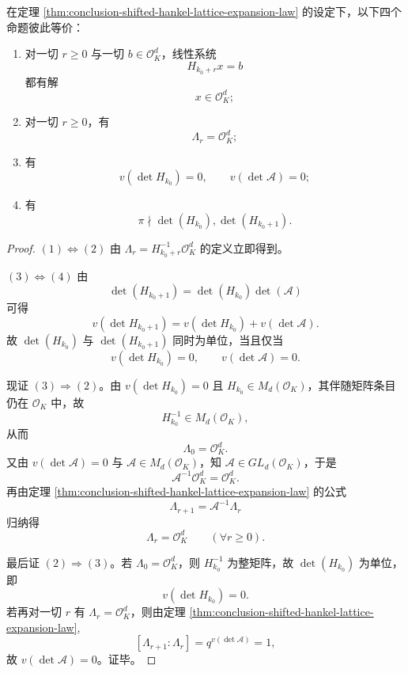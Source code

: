 \begin{theorem}[统一积分性的四重等价]\label{thm:conclusion-shifted-hankel-uniform-integrality-fourfold-equivalence}
在定理 \ref{thm:conclusion-shifted-hankel-lattice-expansion-law} 的设定下，以下四个命题彼此等价：
\begin{enumerate}
  \item 对一切 \(r\ge 0\) 与一切 \(b\in \mathcal O_K^d\)，线性系统
  \[
  H_{k_0+r}x=b
  \]
  都有解
  \[
  x\in \mathcal O_K^d;
  \]
  \item 对一切 \(r\ge 0\)，有
  \[
  \Lambda_r=\mathcal O_K^d;
  \]
  \item 有
  \[
  v(\det H_{k_0})=0,\qquad v(\det \mathcal A)=0;
  \]
  \item 有
  \[
  \pi\nmid \det(H_{k_0}),\det(H_{k_0+1}).
  \]
\end{enumerate}
\end{theorem}
\begin{proof}
\((1)\Leftrightarrow(2)\) 由 \(\Lambda_r=H_{k_0+r}^{-1}\mathcal O_K^d\) 的定义立即得到。

\((3)\Leftrightarrow(4)\) 由
\[
\det(H_{k_0+1})=\det(H_{k_0})\det(\mathcal A)
\]
可得
\[
v(\det H_{k_0+1})=v(\det H_{k_0})+v(\det \mathcal A).
\]
故 \(\det(H_{k_0})\) 与 \(\det(H_{k_0+1})\) 同时为单位，当且仅当
\[
v(\det H_{k_0})=0,\qquad v(\det \mathcal A)=0.
\]

现证 \((3)\Rightarrow(2)\)。由 \(v(\det H_{k_0})=0\) 且 \(H_{k_0}\in M_d(\mathcal O_K)\)，其伴随矩阵条目仍在 \(\mathcal O_K\) 中，故
\[
H_{k_0}^{-1}\in M_d(\mathcal O_K),
\]
从而
\[
\Lambda_0=\mathcal O_K^d.
\]
又由 \(v(\det \mathcal A)=0\) 与 \(\mathcal A\in M_d(\mathcal O_K)\)，知 \(\mathcal A\in GL_d(\mathcal O_K)\)，于是
\[
\mathcal A^{-1}\mathcal O_K^d=\mathcal O_K^d.
\]
再由定理 \ref{thm:conclusion-shifted-hankel-lattice-expansion-law} 的公式
\[
\Lambda_{r+1}=\mathcal A^{-1}\Lambda_r
\]
归纳得
\[
\Lambda_r=\mathcal O_K^d\qquad(\forall r\ge 0).
\]

最后证 \((2)\Rightarrow(3)\)。若 \(\Lambda_0=\mathcal O_K^d\)，则 \(H_{k_0}^{-1}\) 为整矩阵，故 \(\det(H_{k_0})\) 为单位，即
\[
v(\det H_{k_0})=0.
\]
若再对一切 \(r\) 有 \(\Lambda_r=\mathcal O_K^d\)，则由定理 \ref{thm:conclusion-shifted-hankel-lattice-expansion-law},
\[
[\Lambda_{r+1}:\Lambda_r]=q^{v(\det \mathcal A)}=1,
\]
故 \(v(\det \mathcal A)=0\)。证毕。
\end{proof}

